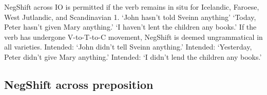 \documentclass[12pt, letterpaper]{article}
\begin{document}
\ea  NegShift across IO is permitted if the verb remains in situ for Icelandic, Faroese, West Jutlandic, and Scandinavian 1.
	\glt `John hasn't told Sveinn anything'%
	\glt `Today, Peter hasn't given Mary anything.'%
	\glt `I haven't lent the children any books.'
	\z 
\ex If the verb has undergone V-to-T-to-C movement, NegShift is deemed ungrammatical in all varieties.
	\glt Intended: `John didn't tell Sveinn anything.'%
	\glt Intended: `Yesterday, Peter didn't give Mary anything.'%
	\glt Intended: `I didn't lend the children any books.'%
	\z 
\z 

\subsection{NegShift across preposition}
\end{document}
